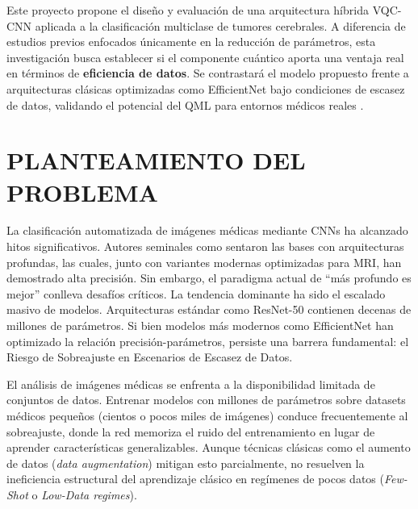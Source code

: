 \documentclass[12pt,letterpaper]{article}
\begin{document}
    Este proyecto propone el diseño y evaluación de una arquitectura híbrida VQC-CNN aplicada a la clasificación multiclase de tumores cerebrales.
    A diferencia de estudios previos enfocados únicamente en la reducción de parámetros, esta investigación busca establecer si el componente cuántico aporta una ventaja real en términos de \textbf{eficiencia de datos}.
    Se contrastará el modelo propuesto frente a arquitecturas clásicas optimizadas como EfficientNet \citep{tan2019efficientnet} bajo condiciones de escasez de datos, validando el potencial del QML para entornos médicos reales \citep{khan2024brain}.

    \newpage
    \section{PLANTEAMIENTO DEL PROBLEMA}
    \vspace{-0.5cm}

    La clasificación automatizada de imágenes médicas mediante CNNs ha alcanzado hitos significativos.
    Autores seminales como \citet{he2016deep} sentaron las bases con arquitecturas profundas, las cuales, junto con variantes modernas optimizadas para MRI, han demostrado alta precisión.
    Sin embargo, el paradigma actual de ``más profundo es mejor'' conlleva desafíos críticos.
    La tendencia dominante ha sido el escalado masivo de modelos. Arquitecturas estándar como ResNet-50 contienen decenas de millones de parámetros.
    Si bien modelos más modernos como EfficientNet \citep{tan2019efficientnet} han optimizado la relación precisión-parámetros, persiste una barrera fundamental: el Riesgo de Sobreajuste en Escenarios de Escasez de Datos.

    El análisis de imágenes médicas se enfrenta a la disponibilidad limitada de conjuntos de datos.
    Entrenar modelos con millones de parámetros sobre datasets médicos pequeños (cientos o pocos miles de imágenes) conduce frecuentemente al sobreajuste, donde la red memoriza el ruido del entrenamiento en lugar de aprender características generalizables.
    Aunque técnicas clásicas como el aumento de datos (\textit{data augmentation}) mitigan esto parcialmente, no resuelven la ineficiencia estructural del aprendizaje clásico en regímenes de pocos datos (\textit{Few-Shot} o \textit{Low-Data regimes}).
\end{document}
